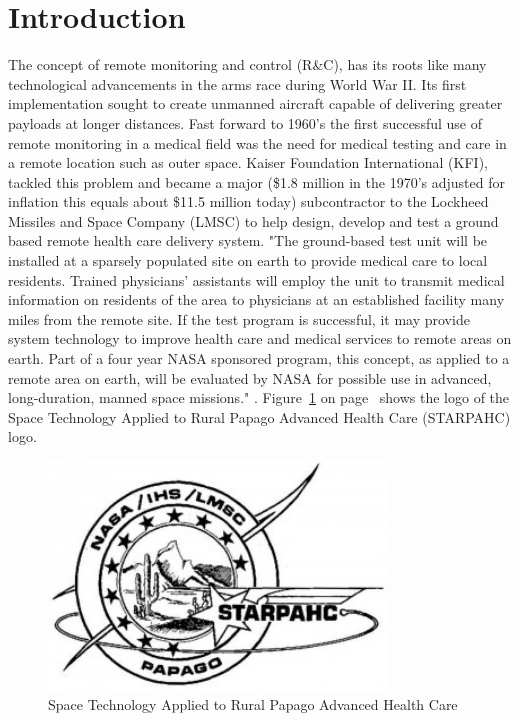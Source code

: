 \documentclass[12pt,]{article}
\numberwithin{figure}{section}
\begin{document}
\tableofcontents
\newpage
\listoffigures
\newpage
\listoftables
\newpage


\section{Introduction}
The concept of remote monitoring and control (R\&C), has its roots like many technological advancements in the arms race during World War II. Its first implementation sought to create unmanned aircraft capable of delivering greater payloads at longer distances. Fast forward to 1960's the first successful use of remote monitoring in a medical field was the need for medical testing and care in a remote location such as outer space. Kaiser Foundation International (KFI), tackled this problem and became a major (\$1.8 million in the 1970's adjusted for inflation this equals about \$11.5 million today) subcontractor to the Lockheed Missiles and Space Company (LMSC) to help design, develop and test a ground based remote health care delivery system. "The ground-based test unit will be installed at a sparsely populated site on earth to provide medical care to local residents. Trained physicians’ assistants will employ the unit to transmit medical information on residents of the area to physicians at an established facility many miles from the remote site. If the test program is successful, it may provide system technology to improve health care and medical services to remote areas on earth. Part of a four year NASA sponsored program, this concept, as applied to a remote area on earth, will be evaluated by NASA for possible use in advanced, long-duration, manned space missions." \cite{KFI} . Figure~\ref{fig:1} on page~\pageref{fig:1} shows the logo of the Space Technology Applied to Rural Papago Advanced Health Care (STARPAHC) logo.
\begin{figure}[H]
  	\begin{center}
    	\includegraphics[width=0.8\textwidth]{1}
  	\end{center}
  	\caption{Space Technology Applied to Rural Papago Advanced Health Care \cite{KFI}}
	\label{fig:1}
\end{figure}
\end{document}
